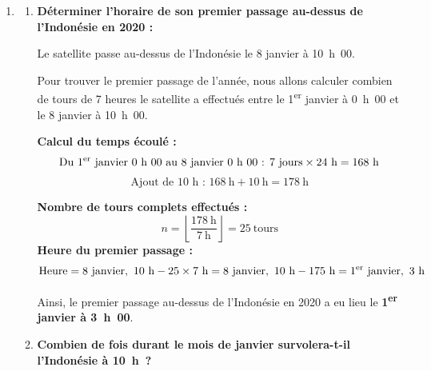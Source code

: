 \documentclass{article}
\begin{document}
\begin{enumerate}
\begin{enumerate}
        Donc, le satellite passera au-dessus du Kenya à :
        \[
        2~\text{h} + 7 \times 10~\text{h} = 2~\text{h} + 70~\text{h} = 72~\text{h}
        \]
        Comme 72~h correspond à 3 jours (72~h $=$ 3 $\times$ 24~h), le satellite survolera le Kenya à 0~h~00 le :
        \[
        1\textsuperscript{er}~\text{janvier},\ 2~\text{h} + 3~\text{jours} = 4~\text{janvier},\ 2~\text{h}
        \]
        Mais comme 72~h $=$ 3 jours $\times$ 24~h, l'heure correspondante est 0~h~00 le 4 janvier (puisque 2~h + 72~h = 2~h + 3 $\times$ 24~h = 2~h + 72~h = 74~h, ce qui revient à 0~h~00 après avoir enlevé 3 $\times$ 24~h).

        \textbf{Réponse :} Oui, le satellite survolera le Kenya à 0~h~00 le 4 janvier 2020.

    \end{enumerate}
    
    \item
    \begin{enumerate}
        \item \textbf{Déterminer l’horaire de son premier passage au-dessus de l’Indonésie en 2020 :}

        Le satellite passe au-dessus de l'Indonésie le 8 janvier à 10~h~00.

        Pour trouver le premier passage de l'année, nous allons calculer combien de tours de 7 heures le satellite a effectués entre le 1\textsuperscript{er} janvier à 0~h~00 et le 8 janvier à 10~h~00.

        \textbf{Calcul du temps écoulé :}
        \[
        \text{Du 1\textsuperscript{er} janvier 0~h~00 au 8 janvier 0~h~00 : } 7~\text{jours} \times 24~\text{h} = 168~\text{h}
        \]
        \[
        \text{Ajout de 10~h : } 168~\text{h} + 10~\text{h} = 178~\text{h}
        \]

        \textbf{Nombre de tours complets effectués :}
        \[
        n = \left\lfloor \dfrac{178~\text{h}}{7~\text{h}} \right\rfloor = 25~\text{tours}
        \]
        \textbf{Heure du premier passage :}
        \[
        \text{Heure} = 8~\text{janvier},\ 10~\text{h} - 25 \times 7~\text{h} = 8~\text{janvier},\ 10~\text{h} - 175~\text{h} = 1\textsuperscript{er}~\text{janvier},\ 3~\text{h}
        \]

        Ainsi, le premier passage au-dessus de l'Indonésie en 2020 a eu lieu le \textbf{1\textsuperscript{er} janvier à 3~h~00}.

        \item \textbf{Combien de fois durant le mois de janvier survolera-t-il l’Indonésie à 10~h~?}


\end{enumerate}
\end{enumerate}
\end{document}

